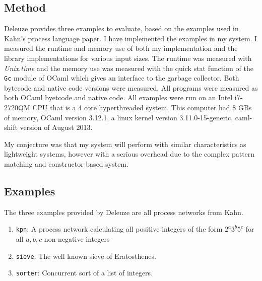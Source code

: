 \documentclass[12pt,twoside,notitlepage]{report}
\begin{document}
\subsection{Method}
Deleuze provides three examples to evaluate, based on the examples used in Kahn's process language paper\cite{kahn1976coroutines}. I have implemented the examples in my system. I measured the runtime and memory use of both my implementation and the library implementations for various input sizes. The runtime was measured with \textit{Unix.time} and the memory use was measured with the quick stat function of the \verb|Gc| module of OCaml which gives an interface to the garbage collector. Both bytecode and native code versions were measured. All programs were measured as both OCaml byetcode and native code. All examples were run on an Intel i7-2720QM CPU that is a 4 core hyperthreaded system. This computer had 8 GBs of memory, OCaml version 3.12.1, a linux kernel version 3.11.0-15-generic, caml-shift version of August 2013.


My conjecture was that my system will perform with similar characteristics as lightweight systems, however with a serious overhead due to the complex pattern matching and constructor based system.
\subsection{Examples}
The three examples provided by Deleuze are all process networks from Kahn\cite{kahn1976coroutines}.
\begin{enumerate}
\item{\verb|kpn|: A process network calculating all positive integers of the form $ 2^a3^b5^c $ for all $ a,b,c $ non-negative integers}
\item{\verb|sieve|: The well known sieve of Eratosthenes.}
\item{\verb|sorter|: Concurrent sort of a list of integers.}
\end{enumerate}
\end{document}
